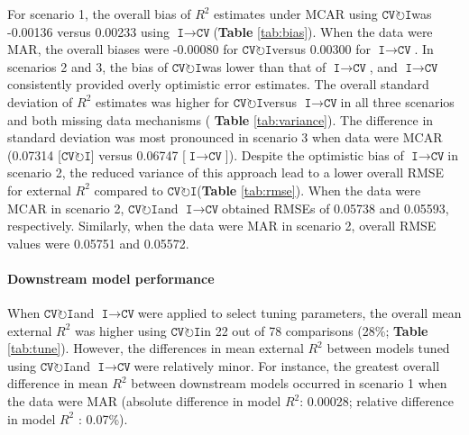 \documentclass[AMA,STIX1COL,doublespace]{WileyNJD-v2}
\begin{document}
For scenario 1, the overall bias of \(R^2\) estimates under MCAR using
$\texttt{CV}\!\circlearrowright\!\texttt{I}$\space was -0.00136 versus
0.00233 using
$\texttt{I}\!\!\rightarrow\!\texttt{CV}$\space (\textbf{Table}
\ref{tab:bias}). When the data were MAR, the overall biases were
-0.00080 for $\texttt{CV}\!\circlearrowright\!\texttt{I}$\space versus
0.00300 for $\texttt{I}\!\!\rightarrow\!\texttt{CV}$\space. In scenarios
2 and 3, the bias of
$\texttt{CV}\!\circlearrowright\!\texttt{I}$\space was lower than that
of $\texttt{I}\!\!\rightarrow\!\texttt{CV}$\space, and
$\texttt{I}\!\!\rightarrow\!\texttt{CV}$\space consistently provided
overly optimistic error estimates. The overall standard deviation of
\(R^2\) estimates was higher for
$\texttt{CV}\!\circlearrowright\!\texttt{I}$\space versus
$\texttt{I}\!\!\rightarrow\!\texttt{CV}$\space in all three scenarios
and both missing data mechanisms ( \textbf{Table} \ref{tab:variance}).
The difference in standard deviation was most pronounced in scenario 3
when data were MCAR (0.07314
{[}$\texttt{CV}\!\circlearrowright\!\texttt{I}${]} versus 0.06747
{[}$\texttt{I}\!\!\rightarrow\!\texttt{CV}${]}). Despite the optimistic
bias of $\texttt{I}\!\!\rightarrow\!\texttt{CV}$\space in scenario 2,
the reduced variance of this approach lead to a lower overall RMSE for
external \(R^2\) compared to
$\texttt{CV}\!\circlearrowright\!\texttt{I}$\space (\textbf{Table}
\ref{tab:rmse}). When the data were MCAR in scenario 2,
$\texttt{CV}\!\circlearrowright\!\texttt{I}$\space and
$\texttt{I}\!\!\rightarrow\!\texttt{CV}$\space obtained RMSEs of 0.05738
and 0.05593, respectively. Similarly, when the data were MAR in scenario
2, overall RMSE values were 0.05751 and 0.05572.

\paragraph{Downstream model performance}

When $\texttt{CV}\!\circlearrowright\!\texttt{I}$\space and
$\texttt{I}\!\!\rightarrow\!\texttt{CV}$\space were applied to select
tuning parameters, the overall mean external \(R^2\) was higher using
$\texttt{CV}\!\circlearrowright\!\texttt{I}$\space in 22 out of 78
comparisons (28\%; \textbf{Table} \ref{tab:tune}). However, the
differences in mean external \(R^2\) between models tuned using
$\texttt{CV}\!\circlearrowright\!\texttt{I}$\space and
$\texttt{I}\!\!\rightarrow\!\texttt{CV}$\space were relatively minor.
For instance, the greatest overall difference in mean \(R^2\) between
downstream models occurred in scenario 1 when the data were MAR
(absolute difference in model \(R^2\): 0.00028; relative difference in
model \(R^2\) : 0.07\%).
\end{document}
